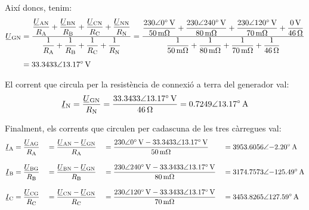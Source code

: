 \begin{exemple}
    Així doncs, tenim:
    \begin{align*}
    \cmplx{U}\ped{GN} &= \frac{ \dfrac{\cmplx{U}\ped{AN}}{R\ped{A}} + \dfrac{\cmplx{U}\ped{BN}}{R\ped{B}} + \dfrac{\cmplx{U}\ped{CN}}{R\ped{C}} + \dfrac{\cmplx{U}\ped{NN}}{R\ped{N}}} { \dfrac{1}{R\ped{A}} + \dfrac{1}{R\ped{B}} + \dfrac{1}{R\ped{C}} + \dfrac{1}{R\ped{N}} } =
    \frac{\dfrac{\complexqty{230:0}{V}}{\qty{50}{m\ohm}}+\dfrac{\complexqty{230:240}{V}}{\qty{80}{m\ohm}}+
    \dfrac{\complexqty{230:120}{V}}{\qty{70}{m\ohm}} + \dfrac{\qty{0}{V}}{\qty{46}{\ohm}} }{\dfrac{1}{\qty{50}{m\ohm}}+\dfrac{1}{\qty{80}{m\ohm}}+
    \dfrac{1}{\qty{70}{m\ohm}}+\dfrac{1}{\qty{46}{\ohm}}} \\[1ex]
    &=\complexqty{33,3433:13,17}{V}
    \end{align*}

    El corrent  que circula per la resistència de connexió a terra del generador val:
    \[
    \cmplx{I}\ped{N} = \frac{\cmplx{U}\ped{GN}}{R\ped{N}} = \frac{\complexqty{33,3433:13,17}{V}}{\qty{46}{\ohm}}
    = \complexqty{0,7249:13,17}{A}
    \]

    Finalment, els corrents que circulen per cadascuna de les tres càrregues val:
    \begin{alignat*}{4}
    \cmplx{I}\ped{A} &= \frac{\cmplx{U}\ped{AG}}{R\ped{A}} &&= \frac{\cmplx{U}\ped{AN} - \cmplx{U}\ped{GN}}{R\ped{A}} &&= \frac{\complexqty{230:0}{V}-\complexqty{33,3433:13,17}{V}}{\qty{50}{m\ohm}}
    &&= \complexqty{3953,6056:-2,20}{A}\\[2ex]
    \cmplx{I}\ped{B} &= \frac{\cmplx{U}\ped{BG}}{R\ped{B}} &&= \frac{\cmplx{U}\ped{BN} - \cmplx{U}\ped{GN}}{R\ped{B}} &&= \frac{\complexqty{230:240}{V}-\complexqty{33,3433:13,17}{V}}{\qty{80}{m\ohm}}
    &&= \complexqty{3174,7573:-125,49}{A}\\[2ex]
    \cmplx{I}\ped{C} &= \frac{\cmplx{U}\ped{CG}}{R\ped{C}} &&= \frac{\cmplx{U}\ped{CN} - \cmplx{U}\ped{GN}}{R\ped{C}} &&= \frac{\complexqty{230:120}{V}-\complexqty{33,3433:13,17}{V}}{\qty{70}{m\ohm}}
    &&= \complexqty{3453,8265:127,59}{A}
    \end{alignat*}
\end{exemple}

